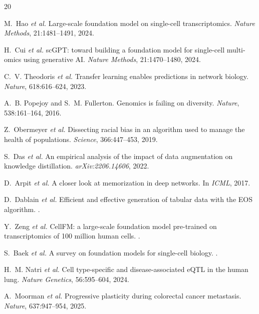 \documentclass[sigconf]{acmart}
\begin{document}
\begin{thebibliography}{20}

M.~Hao \textit{et al.}
\newblock Large-scale foundation model on single-cell transcriptomics.
\newblock \textit{Nature Methods}, 21:1481--1491, 2024.

H.~Cui \textit{et al.}
\newblock scGPT: toward building a foundation model for single-cell multi-omics using generative AI.
\newblock \textit{Nature Methods}, 21:1470--1480, 2024.

C.~V. Theodoris \textit{et al.}
\newblock Transfer learning enables predictions in network biology.
\newblock \textit{Nature}, 618:616--624, 2023.

A.~B. Popejoy and S.~M. Fullerton.
\newblock Genomics is failing on diversity.
\newblock \textit{Nature}, 538:161--164, 2016.

Z.~Obermeyer \textit{et al.}
\newblock Dissecting racial bias in an algorithm used to manage the health of populations.
\newblock \textit{Science}, 366:447--453, 2019.

S.~Das \textit{et al.}
\newblock An empirical analysis of the impact of data augmentation on knowledge distillation.
\newblock \textit{arXiv:2206.14606}, 2022.

D.~Arpit \textit{et al.}
\newblock A closer look at memorization in deep networks.
\newblock In \textit{ICML}, 2017.

D.~Dablain \textit{et al.}
\newblock Efficient and effective generation of tabular data with the EOS algorithm.
.

Y.~Zeng \textit{et al.}
\newblock CellFM: a large-scale foundation model pre-trained on transcriptomics of 100 million human cells.
.

S.~Baek \textit{et al.}
\newblock A survey on foundation models for single-cell biology.
.

H.~M. Natri \textit{et al.}
\newblock Cell type-specific and disease-associated eQTL in the human lung.
\newblock \textit{Nature Genetics}, 56:595--604, 2024.

A.~Moorman \textit{et al.}
\newblock Progressive plasticity during colorectal cancer metastasis.
\newblock \textit{Nature}, 637:947--954, 2025.


\end{thebibliography}
\end{document}
